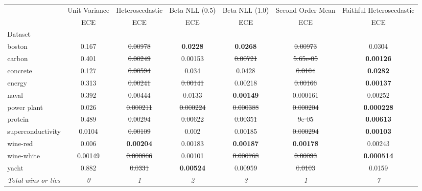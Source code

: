 \begin{tabular}{l|c|c|c|c|c|c}
\toprule
{} & {Unit Variance} & {Heteroscedastic} & {Beta NLL (0.5)} & {Beta NLL (1.0)} & {Second Order Mean} & {Faithful Heteroscedastic} \\
{} & {ECE} & {ECE} & {ECE} & {ECE} & {ECE} & {ECE} \\
{Dataset} & {} & {} & {} & {} & {} & {} \\
\midrule
boston & 0.167 & \sout{0.00978} & \textbf{0.0228} & \textbf{0.0268} & \sout{0.00973} & 0.0304 \\
carbon & 0.401 & \sout{0.00249} & 0.00153 & \sout{0.00721} & \sout{5.65e-05} & \textbf{0.00126} \\
concrete & 0.127 & \sout{0.00594} & 0.034 & 0.0428 & \sout{0.0104} & \textbf{0.0282} \\
energy & 0.313 & \sout{0.00241} & \sout{0.00141} & 0.00218 & \sout{0.00166} & \textbf{0.00137} \\
naval & 0.392 & \sout{0.00444} & \sout{0.0133} & \textbf{0.00149} & \sout{0.000161} & 0.00252 \\
power plant & 0.026 & \sout{0.000211} & \sout{0.000224} & \sout{0.000388} & \sout{0.000204} & \textbf{0.000228} \\
protein & 0.489 & \sout{0.00294} & \sout{0.00622} & \sout{0.00351} & \sout{9e-05} & \textbf{0.00613} \\
superconductivity & 0.0104 & \sout{0.00109} & 0.002 & 0.00185 & \sout{0.000294} & \textbf{0.00103} \\
wine-red & 0.006 & \textbf{0.00204} & 0.00183 & \textbf{0.00187} & \textbf{0.00178} & 0.00243 \\
wine-white & 0.00149 & \sout{0.000866} & 0.00101 & \sout{0.000768} & \sout{0.00093} & \textbf{0.000514} \\
yacht & 0.882 & \sout{0.0331} & \textbf{0.00524} & 0.00959 & \sout{0.0103} & 0.0159 \\
\textit{{Total wins or ties}} & \textit{0} & \textit{1} & \textit{2} & \textit{3} & \textit{1} & \textit{7} \\
\bottomrule
\end{tabular}
